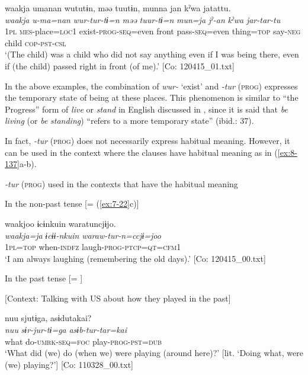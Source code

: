 \ex
{\TM}
\glll  waakja  umanan  wututɨn,  məə   tuutɨn,  munna  jan  kˀwa  jatattu.\\
\textit{waakja}  \textit{u-ma=nan}  \textit{wur-tur-tɨ=n  məə}      \textit{tuur-tɨ=n}  \textit{mun=ja}  \textit{jˀ-an}  \textit{kˀwa}  \textit{jar-tar-tu}\\
1\textsc{pl}  \textsc{mes}-place=\textsc{loc}1  exist-\textsc{prog}-\textsc{seq}=even  front  pass-\textsc{seq}=even  thing=\textsc{top}  say-\textsc{neg}  child  \textsc{cop}-\textsc{pst}-\textsc{csl}\\
\glt ‘(The child) was a child who did not say anything even if I was being there, even if (the child) passed right in front (of me).’ [Co: 120415\_01.txt]
\z
\z

In the above examples, the combination of \textit{wur-} ‘exist’ and \textit{-tur} (\textsc{prog}) expresses the temporary state of being at these places. This phenomenon is similar to “the Progress” form of \textit{live} or \textit{stand} in English discussed in \citet{Comrie1976}, since it is said that \textit{be} \textit{living} (or \textit{be} \textit{standing}) “refers to a more temporary state” (ibid.: 37).

  In fact, \textit{-tur} (\textsc{prog}) does not necessarily express habitual meaning. However, it can be used in the context where the clauses have habitual meaning as in (\ref{ex:8-137}a-b).

\ea\label{ex:8-137}
  \textit{-tur} (\textsc{prog}) used in the contexts that have the habitual meaning

\ea In the non-past tense [= (\ref{ex:7-22}c)]

{\TM}
\glll  waakjoo  ɨcɨnkuin  waratuncjɨjo.\\
\textit{waakja=ja}  \textit{ɨcɨɨ-nkuin}  \textit{waraw-tur-n=ccjɨ=joo}\\
1\textsc{pl}=\textsc{top}  when-\textsc{indfz}  laugh-\textsc{prog}-\textsc{ptcp}=\textsc{qt}=\textsc{cfm1}\\
\glt ‘I am always laughing (remembering the old days).’ [Co: 120415\_00.txt]

\ex In the past tense [= ]

    [Context: Talking with US about how they played in the past]

{\TM}
\glll  nuu  sjutɨga,  asɨdutakai?\\
\textit{nuu}  \textit{sɨr-jur-tɨ=ga}  \textit{asɨb-tur-tar=kai}\\
what  do-\textsc{umrk}-\textsc{seq}=\textsc{foc}  play-\textsc{prog}-\textsc{pst}=\textsc{dub}\\
\glt ‘What did (we) do (when we) were playing (around here)?’ [lit. ‘Doing what, were (we) playing?’]       [Co: 110328\_00.txt]
\z
\z


